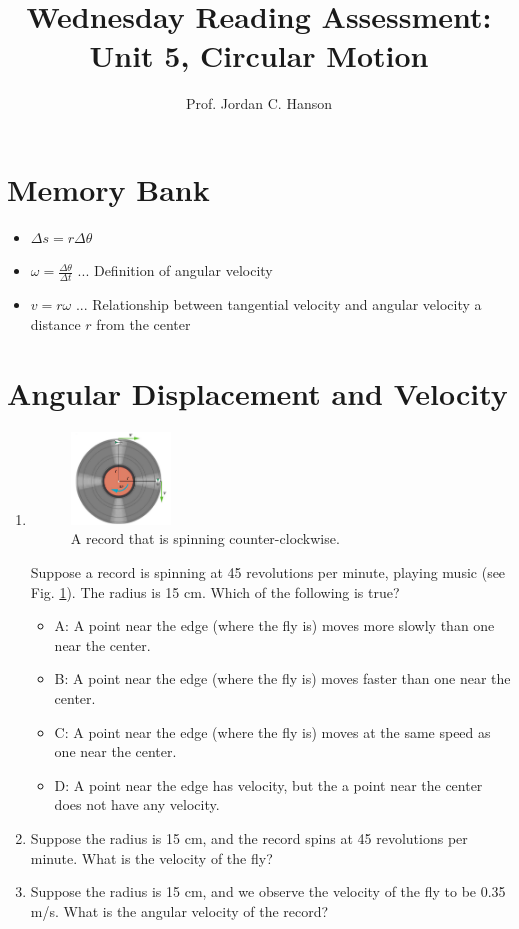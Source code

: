 \documentclass{article}
\begin{document}
\title{Wednesday Reading Assessment: Unit 5, Circular Motion}
\author{Prof. Jordan C. Hanson}

\maketitle

\section{Memory Bank}

\begin{itemize}
\item $\Delta s = r \Delta \theta$
\item $\omega = \frac{\Delta \theta}{\Delta t}$ ... Definition of angular velocity
\item $v = r\omega $ ... Relationship between tangential velocity and angular velocity a distance $r$ from the center
\end{itemize}

\section{Angular Displacement and Velocity}

\begin{enumerate}
\item 
\begin{figure}[ht]
\centering
\includegraphics[width=0.25\textwidth]{record.png}
\caption{\label{fig:record} A record that is spinning counter-clockwise.}
\end{figure}

Suppose a record is spinning at 45 revolutions per minute, playing music (see Fig. \ref{fig:record}).  The radius is 15 cm.  Which of the following is true?
\begin{itemize}
\item A: A point near the edge (where the fly is) moves more slowly than one near the center. 
\item B: A point near the edge (where the fly is) moves faster than one near the center.
\item C: A point near the edge (where the fly is) moves at the same speed as one near the center.
\item D: A point near the edge has velocity, but the a point near the center does not have any velocity.
\end{itemize}
\item Suppose the radius is 15 cm, and the record spins at 45 revolutions per minute.  What is the velocity of the fly? \\ \vspace{2cm}
\item Suppose the radius is 15 cm, and we observe the velocity of the fly to be 0.35 m/s.  What is the angular velocity of the record?
\end{enumerate}
\end{document}
